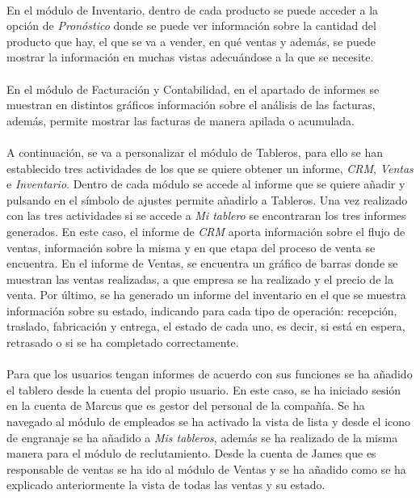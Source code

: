 \paragraph{}
En el módulo de Inventario, dentro de cada producto se puede acceder a la opción de \textit{Pronóstico} donde se puede ver información sobre la cantidad del producto que hay, el que se va a vender, en qué ventas y además, se puede mostrar la información en muchas vistas adecuándose a la que se necesite. 
\paragraph{}
En el módulo de Facturación y Contabilidad, en el apartado de informes se muestran en distintos gráficos información sobre el análisis de las facturas, además, permite mostrar las facturas de manera apilada o acumulada. 
\paragraph{}
A continuación, se va a personalizar el módulo de Tableros, para ello se han establecido tres actividades de los que se quiere obtener un informe, \textit{CRM}, \textit{Ventas} e \textit{Inventario}. Dentro de cada módulo se accede al informe que se quiere añadir y pulsando en el símbolo de ajustes permite añadirlo a Tableros. Una vez realizado con las tres actividades si se accede a \textit{Mi tablero} se encontraran los tres informes generados. En este caso, el informe de \textit{CRM} aporta información sobre el flujo de ventas, información sobre la misma y en que etapa del proceso de venta se encuentra. En el informe de Ventas, se encuentra un gráfico de barras donde se muestran las ventas realizadas, a que empresa se ha realizado y el precio de la venta. Por último, se ha generado un informe del inventario en el que se muestra información sobre su estado, indicando para cada tipo de operación: recepción, traslado, fabricación y entrega, el estado de cada uno, es decir, si está en espera, retrasado o si se ha completado correctamente.
\paragraph{}
Para que los usuarios tengan informes de acuerdo con sus funciones se ha añadido el tablero desde la cuenta del propio usuario. En este caso, se ha iniciado sesión en la cuenta de Marcus que es gestor del personal de la compañía. Se ha navegado al módulo de empleados se ha activado la vista de lista y desde el icono de engranaje se ha añadido a \textit{Mis tableros}, además se ha realizado de la misma manera para el módulo de reclutamiento. Desde la cuenta de James que es responsable de ventas se ha ido al módulo de Ventas y se ha añadido como se ha explicado anteriormente la vista de todas las ventas y su estado. 
